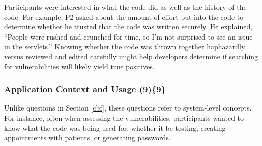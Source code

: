 \documentclass{acm_proc_article-sp}
\begin{document}
Participants were interested in what the code did as well as the history of the code.
For example, P2 asked about the amount of effort put into the code to determine whether he trusted that the code was written securely.
He explained, ``People were rushed and crunched for time, so I'm not surprised to see an issue in the servlets.'' 
Knowing whether the code was thrown together haphazardly versus reviewed and edited carefully might help developers determine if searching for vulnerabilities will likely yield true positives.





% 


\subsubsection{\textbf{Application Context and Usage (9)\{9\}}}\label{acu}

Unlike questions in Section \ref{cbf}, these questions refer to system-level concepts.
For instance, often when assessing the vulnerabilities, participants wanted to know what the code was being used for, whether it be testing, creating appointments with patients, or generating passwords.
\end{document}
